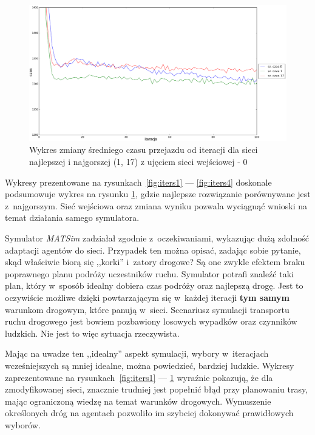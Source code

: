\documentclass[twoside,12pt]{report}
\begin{document}
\begin{figure}[htbp]
\centering
\includegraphics[width=1\textwidth]{img/iters/iters5}
\caption{Wykres zmiany średniego czasu przejazdu od iteracji dla sieci najlepszej i najgorszej (1, 17) z ujęciem sieci wejściowej - 0}
\label{fig:iters5}
\end{figure}

Wykresy prezentowane  na rysunkach~\ref{fig:iters1} --- \ref{fig:iters4} doskonale podsumowuje wykres na rysunku \ref{fig:iters5}, gdzie najlepsze rozwiązanie porównywane jest z~najgorszym. Sieć wejściowa oraz zmiana wyniku pozwala wyciągnąć wnioski na temat działania samego symulatora.

Symulator \textit{MATSim} zadziałał zgodnie z~oczekiwaniami, wykazując dużą zdolność adaptacji agentów do sieci. Przypadek ten można opisać, zadając sobie pytanie, skąd właściwie biorą się ,,korki'' i~zatory drogowe? Są one zwykle efektem braku poprawnego planu podróży uczestników ruchu. Symulator potrafi znaleźć taki plan, który w~sposób idealny dobiera czas podróży oraz najlepszą drogę. Jest to oczywiście możliwe dzięki powtarzającym się w~każdej iteracji \textbf{tym samym} warunkom drogowym, które panują w~sieci. Scenariusz symulacji transportu ruchu drogowego jest bowiem pozbawiony losowych wypadków oraz czynników ludzkich. Nie jest to więc sytuacja rzeczywista.

Mając na uwadze ten ,,idealny'' aspekt symulacji, wybory w~iteracjach wcześniejszych są mniej idealne, można powiedzieć, bardziej ludzkie. Wykresy zaprezentowane na rysunkach~\ref{fig:iters1} --- \ref{fig:iters5} wyraźnie pokazują, że dla zmodyfikowanej sieci, znacznie trudniej jest popełnić błąd przy planowaniu trasy, mając ograniczoną wiedzę na temat warunków drogowych. Wymuszenie określonych dróg na agentach pozwoliło im szybciej dokonywać prawidłowych wyborów.
\end{document}
